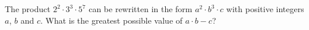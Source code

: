 The product $2^{2}\cdot 3^{3}\cdot 5^{7}$ can be rewritten in the form $a^{2}\cdot b^{3}\cdot c$ with positive integers $a$, $b$ and $c$. What is the greatest possible value of $a\cdot b-c$?
